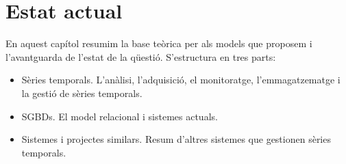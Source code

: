 \chapter{Estat actual} 
\label{cap:estat}


En aquest capítol resumim la base teòrica per als models que proposem
i l'avantguarda de l'estat de la qüestió. S'estructura en tres parts:

\begin{itemize}

\item Sèries temporals. L'anàlisi, l'adquisició, el monitoratge,
  l'emmagatzematge i la gestió de sèries temporals.

\item \Glspl{SGBD}. El model relacional i sistemes
  actuals.

\item Sistemes i projectes similars. Resum d'altres sistemes que gestionen
  sèries temporals.

\end{itemize}











  
















